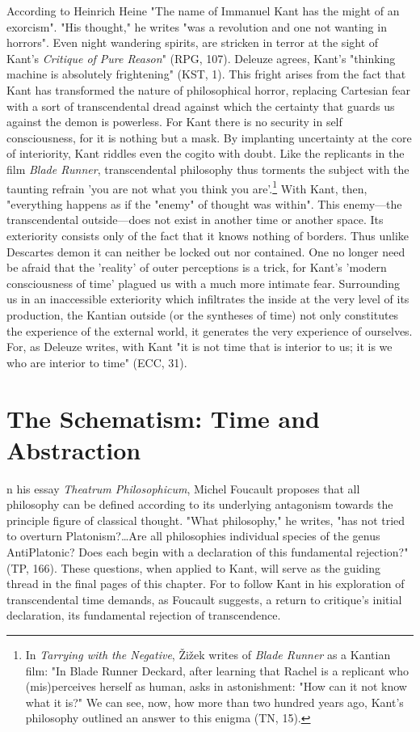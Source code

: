 According to Heinrich Heine "The name of Immanuel Kant has the
might of an exorcism". "His thought," he writes "was a revolution and one not wanting in horrors". Even night wandering spirits, are stricken in terror at the sight of Kant's \textit{Critique of Pure Reason}" (RPG, 107). Deleuze agrees, Kant's "thinking machine is absolutely frightening" (KST, 1). This fright arises from the fact that Kant has transformed the nature of philosophical horror, replacing Cartesian fear with a sort of transcendental dread against which the certainty that guards us against the demon is powerless. For Kant there is no security in self consciousness, for it is nothing but a mask. By implanting uncertainty at the core of interiority, Kant riddles even the cogito with doubt. Like the replicants in the film \textit{Blade Runner}, transcendental philosophy thus torments the subject with the taunting refrain 'you are not what you think you are'.\footnote{In \textit{Tarrying with the Negative}, Žižek writes of \textit{Blade Runner} as a Kantian film: "In Blade Runner Deckard, after learning that Rachel is a replicant who (mis)perceives herself as human, asks in astonishment: "How can it not know what it is?" We can see, now, how more than two hundred years ago, Kant's philosophy outlined an answer to this enigma (TN, 15).} With Kant, then, "everything happens as if the "enemy" of thought was within". This enemy---the transcendental outside---does not exist in another time or another space. Its exteriority consists only of the fact that it knows nothing of borders. Thus unlike Descartes demon it can neither be locked out nor contained. One no longer need be afraid that the 'reality' of outer perceptions is a trick, for Kant's 'modern consciousness of time' plagued us with a much more intimate fear. Surrounding us in an inaccessible exteriority which infiltrates the inside at the very level of its production, the Kantian outside (or the syntheses of time) not only constitutes the experience of the external world, it generates the very experience of ourselves. For, as Deleuze writes, with Kant "it is not time that is interior to us; it is we who are interior to time" (ECC, 31).

\section{The Schematism: Time and Abstraction}

n his essay \textit{Theatrum Philosophicum}, Michel Foucault proposes that all philosophy can be defined according to its underlying antagonism towards the principle figure of classical thought. "What philosophy," he writes, "has not tried to overturn Platonism?\dots Are all philosophies individual species of the genus AntiPlatonic? Does each begin with a declaration of this fundamental rejection?" (TP, 166). These questions, when applied to Kant, will serve as the guiding thread in the final pages of this chapter. For to follow Kant in his exploration of transcendental time demands, as Foucault suggests, a return to critique's initial declaration, its fundamental rejection of transcendence.

